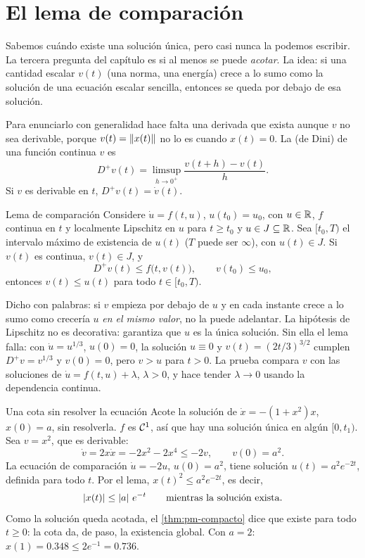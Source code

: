 \section{El lema de comparación}
\label{sec:pm-comparacion}

Sabemos cuándo existe una solución única, pero casi nunca la podemos escribir. La tercera pregunta del capítulo es si al menos se puede \emph{acotar}. La idea: si una cantidad escalar $v(t)$ (una norma, una energía) crece a lo sumo como la solución de una ecuación escalar sencilla, entonces se queda por debajo de esa solución.

Para enunciarlo con generalidad hace falta una derivada que exista aunque $v$ no sea derivable, porque $v(t)=\left\lVert x(t)\right\rVert$ no lo es cuando $x(t)=0$. La  (de Dini) de una función continua $v$ es
\[
  D^+v(t)=\limsup_{h\to0^+}\frac{v(t+h)-v(t)}{h} .
\]
Si $v$ es derivable en $t$, $D^+v(t)=\dot v(t)$.

\begin{lema}[label=lem:pm-comparacion]{Lema de comparación \citep[Lema~3.4]{Kha02}}
Considere $\dot u=f(t,u)$, $u(t_0)=u_0$, con $u\in\mathbb{R}$, $f$ continua en $t$ y localmente Lipschitz en $u$ para $t\ge t_0$ y $u\in J\subseteq\mathbb{R}$. Sea $[t_0,T)$ el intervalo máximo de existencia de $u(t)$ ($T$ puede ser $\infty$), con $u(t)\in J$. Si $v(t)$ es continua, $v(t)\in J$, y
\[
  D^+v(t)\le f\bigl(t,v(t)\bigr),\qquad v(t_0)\le u_0,
\]
entonces $v(t)\le u(t)$ para todo $t\in[t_0,T)$.
\end{lema}

\noindent Dicho con palabras: si $v$ empieza por debajo de $u$ y en cada instante crece a lo sumo como crecería $u$ \emph{en el mismo valor}, no la puede adelantar. La hipótesis de Lipschitz no es decorativa: garantiza que $u$ es la única solución. Sin ella el lema falla: con $\dot u=u^{1/3}$, $u(0)=0$, la solución $u\equiv0$ y $v(t)=(2t/3)^{3/2}$ cumplen $D^+v=v^{1/3}$ y $v(0)=0$, pero $v>u$ para $t>0$. La prueba \citep[§3.4 y apéndice~C]{Kha02} compara $v$ con las soluciones de $\dot u=f(t,u)+\lambda$, $\lambda>0$, y hace tender $\lambda\to0$ usando la dependencia continua.

\begin{ejemplo}[label=ej:pm-comparacion1]{Una cota sin resolver la ecuación}
Acote la solución de $\dot x=-(1+x^2)x$, $x(0)=a$, sin resolverla.
\solucion $f$ es $\mathcal{C}^{1}$, así que hay una solución única en algún $[0,t_1)$. Sea $v=x^2$, que es derivable:
\[
  \dot v=2x\dot x=-2x^2-2x^4\le-2v,\qquad v(0)=a^2 .
\]
La ecuación de comparación $\dot u=-2u$, $u(0)=a^2$, tiene solución $u(t)=a^2e^{-2t}$, definida para todo $t$. Por el lema, $x(t)^2\le a^2e^{-2t}$, es decir,
\[
  \left\lvert x(t)\right\rvert\le\left\lvert a\right\rvert\,e^{-t}\qquad\text{mientras la solución exista.}
\]
Como la solución queda acotada, el \cref{thm:pm-compacto} dice que existe para todo $t\ge0$: la cota da, de paso, la existencia global. Con $a=2$: $x(1)=0.348\le2e^{-1}=0.736$.
\end{ejemplo}

